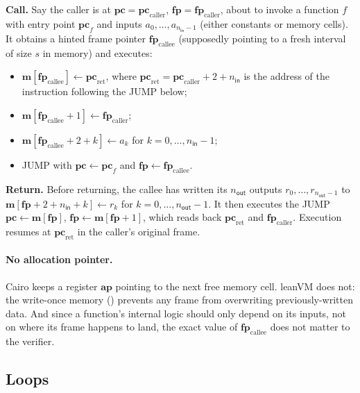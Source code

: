 \documentclass{article}
\theoremstyle{definition}
\begin{document}
\textbf{Call.} Say the caller is at $\textbf{pc} = \textbf{pc}_\text{caller}$, $\textbf{fp} = \textbf{fp}_\text{caller}$, about to invoke a function $f$ with entry point $\textbf{pc}_f$ and inputs $a_0, \dots, a_{n_\textsf{in}-1}$ (either constants or memory cells). It obtains a hinted frame pointer $\textbf{fp}_\text{callee}$ (supposedly pointing to a fresh interval of size $s$ in memory) and executes:
\begin{itemize}
    \item $\textbf{m}[\textbf{fp}_\text{callee}] \gets \textbf{pc}_\text{ret}$, where $\textbf{pc}_\text{ret}  = \textbf{pc}_\text{caller} + 2 + n_\textsf{in}$ is the address of the instruction following the JUMP below;
    \item $\textbf{m}[\textbf{fp}_\text{callee} + 1] \gets \textbf{fp}_\text{caller}$;
    \item $\textbf{m}[\textbf{fp}_\text{callee} + 2 + k] \gets a_k$ for $k = 0, \dots, n_\textsf{in} - 1$;
    \item JUMP with $\textbf{pc} \gets \textbf{pc}_f$ and $\textbf{fp} \gets \textbf{fp}_\text{callee}$.
\end{itemize}

\textbf{Return.} Before returning, the callee has written its $n_\textsf{out}$ outputs $r_0, \dots, r_{n_\textsf{out}-1}$ to $\textbf{m}[\textbf{fp} + 2 + n_\textsf{in} + k] \gets r_k$ for $k = 0, \dots, n_\textsf{out} - 1$. It then executes the JUMP $\textbf{pc} \gets \textbf{m}[\textbf{fp}]$, $\textbf{fp} \gets \textbf{m}[\textbf{fp} + 1]$, which reads back $\textbf{pc}_\text{ret}$ and $\textbf{fp}_\text{caller}$. Execution resumes at $\textbf{pc}_\text{ret}$ in the caller's original frame.

\paragraph{No allocation pointer.} Cairo \cite{cairo} keeps a register $\textbf{ap}$ pointing to the next free memory cell. leanVM does not: the write-once memory () prevents any frame from overwriting previously-written data. And since a function's internal logic should only depend on its inputs, not on where its frame happens to land, the exact value of $\textbf{fp}_\text{callee}$ does not matter to the verifier.


\subsection{Loops}\label{sec:loops}
\end{document}
